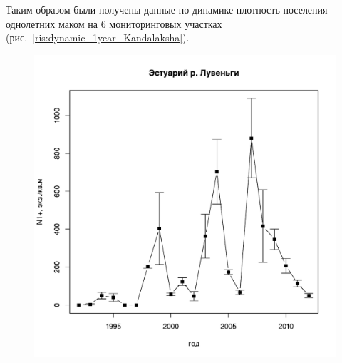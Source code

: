 Таким образом были получены данные по динамике плотность поселения однолетних маком на 6 мониторинговых участках (рис.~\ref{ris:dynamic_1year_Kandalaksha}).
	\begin{figure}[p]
	
	\begin{minipage}[b]{.49\linewidth}
	\begin{center}
	\includegraphics[width=\linewidth]{../White_Sea/Estuatiy_Luvenga/Estuary_N_oneyear1.pdf}


\end{center}
\end{minipage}
\end{figure}
